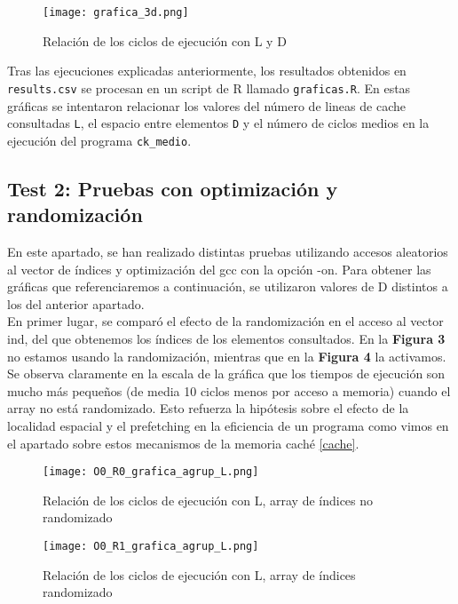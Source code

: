 \documentclass[a4paper,twocolumn]{article}
\begin{document}
    \begin{figure}[h!] 
        \centering
        \texttt{[image: grafica\_3d.png]}
        \caption{Relación de los ciclos de ejecución con L y D}
    \end{figure}
    
	\newpage
	Tras las ejecuciones explicadas anteriormente, los resultados obtenidos en \texttt{results.csv} se procesan en un script de \textsf{R} llamado \texttt{graficas.R}. En estas gráficas se intentaron relacionar los valores del número de lineas de cache consultadas \texttt{L}, el espacio entre elementos \texttt{D} y el número de ciclos medios en la ejecución del programa \texttt{ck\_medio}.
	
	
	
    \subsection{Test 2: Pruebas con optimización y randomización}
    
    En este apartado, se han realizado distintas pruebas utilizando accesos aleatorios al vector de índices y optimización del gcc con la opción -on. Para obtener las gráficas que referenciaremos a continuación, se utilizaron valores de D distintos a los del anterior apartado. \\
    
    En primer lugar, se comparó el efecto de la randomización en el acceso al vector ind, del que obtenemos los índices de los elementos consultados. En la \textbf{Figura 3} no estamos usando la randomización, mientras que en la \textbf{Figura 4} la activamos. Se observa claramente en la escala de la gráfica que los tiempos de ejecución son mucho más pequeños (de media 10 ciclos menos por acceso a memoria) cuando el array no está randomizado. Esto refuerza la hipótesis sobre el efecto de la localidad espacial y el prefetching en la eficiencia de un programa como vimos en el apartado sobre estos mecanismos de la memoria caché \autoref{cache}.
    
	\begin{figure}[h!] 
        \centering
        \texttt{[image: O0\_R0\_grafica\_agrup\_L.png]}
        \caption{Relación de los ciclos de ejecución con L, array de índices no randomizado}
    \end{figure}
	\begin{figure}[h!] 
        \centering
        \texttt{[image: O0\_R1\_grafica\_agrup\_L.png]}
        \caption{Relación de los ciclos de ejecución con L, array de índices randomizado}
    \end{figure}
    
\end{document}
